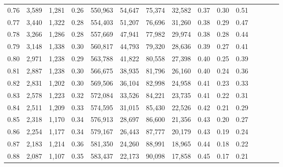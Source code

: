 \begin{tabular}{rrrcrrrrrrrrrrr}
0.76 &   3,589 &  1,281 &                                       0.26 &  550,963 &   54,647 &   75,374 &   32,582 &  0.37 &  0.30 &                         0.51 \\
0.77 &   3,440 &  1,322 &                                       0.28 &  554,403 &   51,207 &   76,696 &   31,260 &  0.38 &  0.29 &                         0.47 \\
0.78 &   3,266 &  1,286 &                                       0.28 &  557,669 &   47,941 &   77,982 &   29,974 &  0.38 &  0.28 &                         0.44 \\
0.79 &   3,148 &  1,338 &                                       0.30 &  560,817 &   44,793 &   79,320 &   28,636 &  0.39 &  0.27 &                         0.41 \\
0.80 &   2,971 &  1,238 &                                       0.29 &  563,788 &   41,822 &   80,558 &   27,398 &  0.40 &  0.25 &                         0.39 \\
0.81 &   2,887 &  1,238 &                                       0.30 &  566,675 &   38,935 &   81,796 &   26,160 &  0.40 &  0.24 &                         0.36 \\
0.82 &   2,831 &  1,202 &                                       0.30 &  569,506 &   36,104 &   82,998 &   24,958 &  0.41 &  0.23 &                         0.33 \\
0.83 &   2,578 &  1,223 &                                       0.32 &  572,084 &   33,526 &   84,221 &   23,735 &  0.41 &  0.22 &                         0.31 \\
0.84 &   2,511 &  1,209 &                                       0.33 &  574,595 &   31,015 &   85,430 &   22,526 &  0.42 &  0.21 &                         0.29 \\
0.85 &   2,318 &  1,170 &                                       0.34 &  576,913 &   28,697 &   86,600 &   21,356 &  0.43 &  0.20 &                         0.27 \\
0.86 &   2,254 &  1,177 &                                       0.34 &  579,167 &   26,443 &   87,777 &   20,179 &  0.43 &  0.19 &                         0.24 \\
0.87 &   2,183 &  1,214 &                                       0.36 &  581,350 &   24,260 &   88,991 &   18,965 &  0.44 &  0.18 &                         0.22 \\
0.88 &   2,087 &  1,107 &                                       0.35 &  583,437 &   22,173 &   90,098 &   17,858 &  0.45 &  0.17 &                         0.21 \\

\end{tabular}
